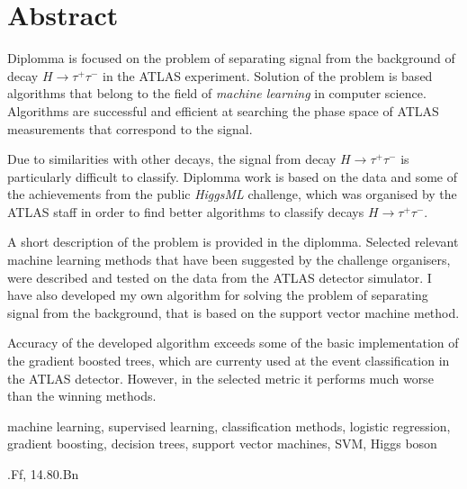 \documentclass[11pt,a4paper,openany]{book}
\begin{document}
\chapter*{Abstract}
\vspace{1.3cm}
\noindent Diplomma is focused on the problem of separating signal from the background of decay $H \rightarrow \tau^+\tau^-$ in the ATLAS experiment. Solution of the problem is based algorithms that belong to the field of \textit{machine learning} in  computer science. Algorithms are successful and efficient at searching the phase space of ATLAS measurements that correspond to the signal.

Due to similarities with other decays, the signal from decay $H \rightarrow \tau^+\tau^-$ is particularly difficult to classify. Diplomma work is based on the data and some of the achievements from the public \textit{HiggsML} challenge, which was organised by the ATLAS staff in order to find better algorithms to classify decays $H \rightarrow \tau^+\tau^-$.

A short description of the problem is provided in the diplomma. Selected relevant machine learning methods that have been suggested by the challenge organisers, were described and tested on the data from the ATLAS detector simulator. I have also developed my own algorithm for solving the problem of separating signal from the background, that is based on the support vector machine method.

Accuracy of the developed algorithm exceeds some of the basic implementation of the gradient boosted trees, which are currenty used at the event classification in the ATLAS detector. However, in the selected metric it performs much worse than the winning methods.
\vspace{1.3cm}

\vspace{0.1cm}

\noindent machine learning, supervised learning, classification methods, logistic regression, gradient boosting, decision trees, support vector machines, SVM, Higgs boson
\vspace{1.3cm}

\vspace{0.1cm} 

.Ff, 14.80.Bn





\end{document}

